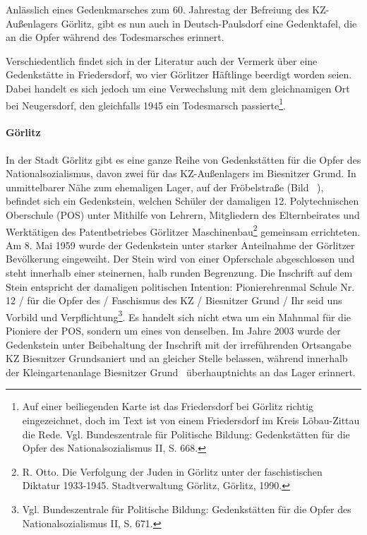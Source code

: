 \documentclass[a4paper,12pt,ngerman,
]{nisebook}
\begin{document}
Anlässlich eines Gedenkmarsches zum 60. Jahrestag der Befreiung des KZ-Außenlagers Görlitz, gibt es nun auch in Deutsch-Paulsdorf eine Gedenktafel, die an die Opfer während des Todesmarsches erinnert.\newline

Verschiedentlich findet sich in der Literatur auch der Vermerk über eine Gedenkstätte in Friedersdorf, wo vier Görlitzer Häftlinge beerdigt worden seien. Dabei handelt es sich jedoch um eine Verwechslung mit dem gleichnamigen Ort bei Neugersdorf, den gleichfalls 1945 ein Todesmarsch passierte\footnote{Auf einer beiliegenden Karte ist das Friedersdorf bei Görlitz richtig eingezeichnet, doch im Text ist von einem Friedersdorf im Kreis Löbau-Zittau die Rede. Vgl. Bundeszentrale für Politische Bildung: Gedenkstätten für die Opfer des Nationalsozialismus II, S. 668.}.


\paragraph{Görlitz}
In der Stadt Görlitz gibt es eine ganze Reihe von Gedenkstätten für die Opfer des Nationalsozialismus, davon zwei für das KZ-Außenlagers im Biesnitzer Grund. 
In unmittelbarer Nähe zum ehemaligen Lager, auf der Fröbelstraße (Bild ~), befindet sich ein Gedenkstein, welchen Schüler der damaligen 12. Polytechnischen Oberschule (POS) unter Mithilfe von \glqq Lehrern, Mitgliedern des Elternbeirates und Werktätigen des Patentbetriebes Görlitzer Maschinenbau\grqq\footnote{R. Otto. Die Verfolgung der Juden in Görlitz unter der faschistischen Diktatur
1933-1945. Stadtverwaltung Görlitz, Görlitz, 1990.}  gemeinsam errichteten. Am 8. Mai 1959 wurde der Gedenkstein unter starker Anteilnahme der Görlitzer Bevölkerung eingeweiht. Der Stein wird von einer Opferschale abgeschlossen und steht innerhalb einer steinernen, halb runden Begrenzung. Die Inschrift auf dem Stein entspricht der damaligen politischen Intention: \glqq Pionierehrenmal Schule Nr. 12 / für die Opfer des / Faschismus des KZ / Biesnitzer Grund / Ihr seid uns Vorbild und Verpflichtung\grqq\footnote{Vgl. Bundeszentrale für Politische Bildung: Gedenkstätten für die Opfer des Nationalsozialismus II, S. 671.}. Es handelt sich nicht etwa um ein Mahnmal für die Pioniere der POS, sondern um eines von denselben. Im Jahre 2003 wurde der Gedenkstein unter Beibehaltung der Inschrift mit der irreführenden Ortsangabe \glqq KZ Biesnitzer Grund\grqq saniert und an gleicher Stelle belassen, während innerhalb der Kleingartenanlage \glqq Biesnitzer Grund\grqq~ überhauptnichts an das Lager erinnert. 
\end{document}
